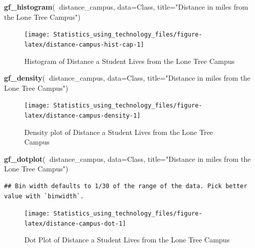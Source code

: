\documentclass[
]{book}
\newenvironment{Shaded}{\begin{snugshade}}{\end{snugshade}}
\newcommand{\DataTypeTok}[1]{\textcolor[rgb]{0.13,0.29,0.53}{#1}}
\newcommand{\KeywordTok}[1]{\textcolor[rgb]{0.13,0.29,0.53}{\textbf{#1}}}
\newcommand{\NormalTok}[1]{#1}
\newcommand{\OperatorTok}[1]{\textcolor[rgb]{0.81,0.36,0.00}{\textbf{#1}}}
\newcommand{\StringTok}[1]{\textcolor[rgb]{0.31,0.60,0.02}{#1}}
\begin{document}
\begin{Shaded}
\begin{Highlighting}[]
\KeywordTok{gf_histogram}\NormalTok{(}\OperatorTok{~}\NormalTok{distance_campus, }\DataTypeTok{data=}\NormalTok{Class, }\DataTypeTok{title=}\StringTok{"Distance in miles from the Lone Tree Campus"}\NormalTok{)}
\end{Highlighting}
\end{Shaded}

\begin{figure}
\texttt{[image: Statistics\_using\_technology\_files/figure-latex/distance-campus-hist-cap-1]} \caption{Histogram of Distance a Student Lives from the Lone Tree Campus}\label{fig:distance-campus-hist-cap}
\end{figure}



\begin{Shaded}
\begin{Highlighting}[]
\KeywordTok{gf_density}\NormalTok{(}\OperatorTok{~}\NormalTok{distance_campus, }\DataTypeTok{data=}\NormalTok{Class, }\DataTypeTok{title=}\StringTok{"Distance in miles from the Lone Tree Campus"}\NormalTok{)}
\end{Highlighting}
\end{Shaded}

\begin{figure}
\texttt{[image: Statistics\_using\_technology\_files/figure-latex/distance-campus-density-1]} \caption{Density plot of Distance a Student Lives from the Lone Tree Campus}\label{fig:distance-campus-density}
\end{figure}



\begin{Shaded}
\begin{Highlighting}[]
\KeywordTok{gf_dotplot}\NormalTok{(}\OperatorTok{~}\NormalTok{distance_campus, }\DataTypeTok{data=}\NormalTok{Class, }\DataTypeTok{title=}\StringTok{"Distance in miles from the Lone Tree Campus"}\NormalTok{)}
\end{Highlighting}
\end{Shaded}

\begin{verbatim}
## Bin width defaults to 1/30 of the range of the data. Pick better value with `binwidth`.
\end{verbatim}

\begin{figure}
\texttt{[image: Statistics\_using\_technology\_files/figure-latex/distance-campus-dot-1]} \caption{Dot Plot of Distance a Student Lives from the Lone Tree Campus}\label{fig:distance-campus-dot}
\end{figure}
\end{document}
